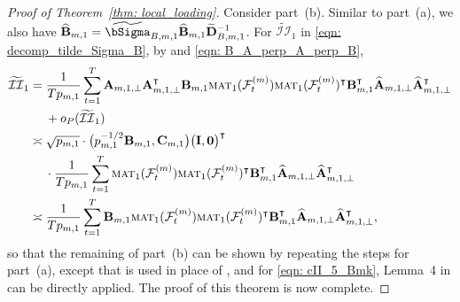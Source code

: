 \documentclass[aos]{imsart}
\theoremstyle{plain}
\theoremstyle{definition}
\def\mat{\textnormal{\textsc{mat}}}
\def\wt#1{\widetilde{#1}}
\def\wh#1{\widehat{#1}}
\def\cF{\mathcal{F}}
\def\cII{\mathcal{II}}
\def\zero{\mathbf{0}}
\def\bI{\mathbf{I}}
\def\bA{\mathbf{A}}
\def\bB{\mathbf{B}}
\def\bD{\mathbf{D}}
\def\bC{\mathbf{C}}
\def\trans{\intercal}
\begin{document}
\begin{proof}[Proof of Theorem~\ref{thm: local_loading}]
Consider part~(b). Similar to part~(a), we also have $\wh{\bB}_{m,1} = \wt\bSigma_{B,m,1} \wh{\bB}_{m,1} \wt{\bD}_{B,m,1}^{-1}$. For $\wt\cII_1$ in \eqref{eqn: decomp_tilde_Sigma_B}, by  and \eqref{eqn: B_A_perp_A_perp_B},
\begin{align*}
    \wt\cII_1 &= \frac{1}{Tp_{m,1}} \sum_{t=1}^T \bA_{m,1,\perp} \bA_{m,1,\perp}^\trans \bB_{m,1} \mat_1(\cF_t^{(m)}) \mat_1(\cF_t^{(m)})^\trans \bB_{m,1}^\trans \wh{\bA}_{m,1,\perp} \wh{\bA}_{m,1,\perp}^\trans \\
    &\;\quad
    + o_P(\wt\cII_1) \\
    &\asymp
    \sqrt{p_{m,1}} \cdot \big( p_{m,1}^{-1/2} \bB_{m,1}, \bC_{m,1} \big) \big( \bI, \zero\big)^\trans \\
    &\;\quad
    \cdot \frac{1}{Tp_{m,1}} \sum_{t=1}^T \mat_1(\cF_t^{(m)}) \mat_1(\cF_t^{(m)})^\trans \bB_{m,1}^\trans \wh{\bA}_{m,1,\perp} \wh{\bA}_{m,1,\perp}^\trans \\
    &\asymp
    \frac{1}{Tp_{m,1}} \sum_{t=1}^T \bB_{m,1} \mat_1(\cF_t^{(m)}) \mat_1(\cF_t^{(m)})^\trans \bB_{m,1}^\trans \wh{\bA}_{m,1,\perp} \wh{\bA}_{m,1,\perp}^\trans ,
\end{align*}
so that the remaining of part~(b) can be shown by repeating the steps for part~(a), except that  is used in place of , and for \eqref{eqn: cII_5_Bmk}, Lemma~4 in \cite{barigozzi2022statistical} can be directly applied. The proof of this theorem is now complete.
\end{proof}
\end{document}
